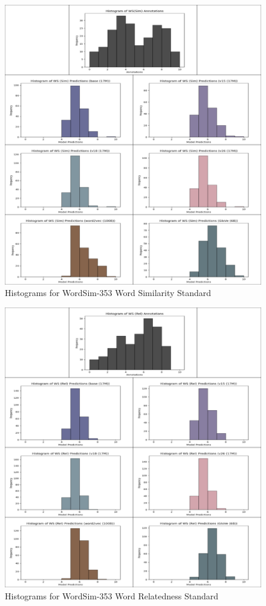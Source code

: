 \begin{figure}[p]
    \centering
    \includegraphics[width=1.0\textwidth]{img/ws_sim_table.PNG}
    \caption{Histograms for WordSim-353 Word Similarity Standard}
    \label{fig:ws_sim_table}
\end{figure}

\begin{figure}[p]
    \centering
    \includegraphics[width=1.0\textwidth]{img/ws_rel_table.PNG}
    \caption{Histograms for WordSim-353 Word Relatedness Standard}
    \label{fig:ws_rel_table}
\end{figure}

